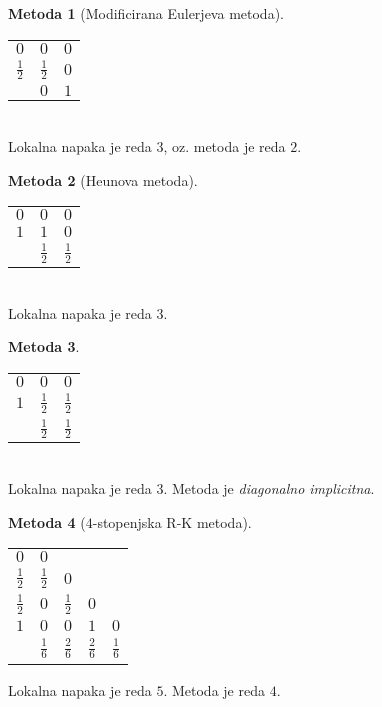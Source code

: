 \documentclass[11pt]{article}
\theoremstyle{definition}
\theoremstyle{definition}
\newtheorem*{metoda}{Metoda}
\begin{document}
\begin{metoda}[Modificirana Eulerjeva metoda]
~\\
\begin{tabular}{c|cc}
$0$ & $0$ & $0$ \\
$\frac{1}{2}$ & $\frac{1}{2}$ & $0$ \\[1ex] \hline
$~$ & $0$ & $1$ 
\end{tabular} \\
Lokalna napaka je reda $3$, oz. metoda je reda $2$.

\end{metoda}
\vspace{0.5cm}
\begin{metoda}[Heunova metoda]
~\\
\begin{tabular}{c|cc}
$0$ & $0$ & $0$ \\
$1$ & $1$ & $0$ \\[1ex] \hline
$~$ & $\frac{1}{2}$ & $\frac{1}{2}$ 
\end{tabular} \\
Lokalna napaka je reda $3$.

\end{metoda}
\vspace{0.5cm}

\begin{metoda}
~\\
\begin{tabular}{c|cc}
$0$ & $0$ & $0$ \\
$1$ & $\frac{1}{2}$ & $\frac{1}{2}$ \\[1ex] \hline
$~$ & $\frac{1}{2}$ & $\frac{1}{2}$ 
\end{tabular} \\
Lokalna napaka je reda $3$. Metoda je \textit{diagonalno implicitna}.

\end{metoda}
\vspace{0.5cm}

\begin{metoda}[$4$-stopenjska R-K metoda]
~\\
\begin{tabular}{c|cccc}
$0$ & $0$ & $~$ & $~$ & $~$ \\
$\frac{1}{2}$ & $\frac{1}{2}$ & $0$ & $~$ & $~$ \\[1ex]
$\frac{1}{2}$ & $0$ & $\frac{1}{2}$ & $0$ & $~$ \\[1ex] 
$1$ & $0$ & $0$ & $1$ & $0$ \\ \hline
~ & $\frac{1}{6}$ & $\frac{2}{6}$ & $\frac{2}{6}$ & $\frac{1}{6}$
\end{tabular}
Lokalna napaka je reda $5$. Metoda je reda $4$.

\end{metoda}
\vspace{0.5cm}


\pagebreak

\end{document}
